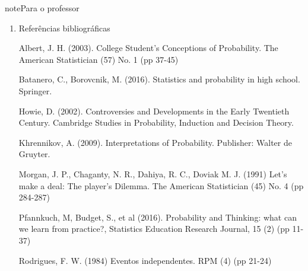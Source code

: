 \begin{sphinxadmonition}{note}{Para o professor}
\begin{enumerate}
\begin{enumerate}
\item {} 
OE11{[}independência de eventos - Aplicar a definição de probabilidade condicional para reconhecer eventos independentes e eventos dependentes.

\item {} 
OE12 {[}independência de eventos{]} - Aplicar a definição de probabilidade condicional no cálculo da probabilidade da interseção de dois eventos quaisquer.

\item {} 
OE13 {[}eventos sequenciais{]} - Entender que a probabilidade da ocorrência simultânea de um número finito de eventos pode ser calculada como o produto de probabilidades adequadas.

\end{enumerate}

 Simulações de experimentos simples usando o GeoGebra. Ilustrações da Lei dos Grandes Números.

: Serão propostos exercícios do ENEM, Vestibulares entre outros abordando os conteúdos deste capítulo. Nos exercícios serão tratados os distratores.

\item {} 
Referências bibliográficas

Albert, J. H. (2003). College Student’s Conceptions of Probability. The American Statistician (57) No. 1 (pp 37-45)

Batanero, C., Borovcnik, M. (2016). Statistics and probability in high school. Springer.

Howie, D. (2002). Controversies and Developments in the Early Twentieth Century. Cambridge Studies in Probability, Induction and Decision Theory.

Khrennikov, A. (2009). Interpretations of Probability. Publisher: Walter de Gruyter.

Morgan, J. P., Chaganty, N. R., Dahiya, R. C., Doviak M. J. (1991)  Let’s make a deal: The player’s Dilemma. The American Statistician (45) No. 4 (pp 284-287)

Pfannkuch, M, Budget, S., et al (2016). Probability and Thinking: what can we learn from practice?, Statistics Education Research Journal, 15 (2) (pp 11-37)

Rodrigues, F. W. (1984) Eventos independentes. RPM (4) (pp 21-24)

\end{enumerate}
\end{sphinxadmonition}

